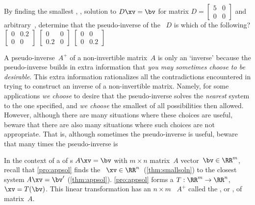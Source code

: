 \begin{activity}
By finding the smallest , , solution to \(D\xv=\bv\) for matrix \(D=\begin{bmatrix} 5&0\\0&0 \end{bmatrix}\) and arbitrary~\bv, determine that the pseudo-inverse of the ~\(D\) is which of the following?
{\(\begin{bmatrix} 0&0.2\\0&0 \end{bmatrix}\)}
{\(\begin{bmatrix} 0&0\\0.2&0 \end{bmatrix}\)}
{\(\begin{bmatrix} 0&0\\0&0.2 \end{bmatrix}\)}
\end{activity}




A pseudo-inverse~\(A^+\) of a non-invertible matrix~\(A\) is only an `inverse' because the pseudo-inverse builds in extra information that  \emph{you may sometimes choose to be desirable}.
This extra information rationalizes all the contradictions encountered in trying to construct an inverse of a non-invertible matrix.  
Namely, for some applications \emph{we choose} to desire that the pseudo-inverse solves the \emph{nearest}  system to the one specified, and \emph{we choose} the smallest of all possibilities then allowed.
However, although there are many situations where these choices are useful, beware that there are also many situations where such choices are not appropriate.
That is, although sometimes the pseudo-inverse is useful, beware that  many times the pseudo-inverse is 


\begin{theorem} \label{thm:lsqlt}
In the context of a  of s \(A\xv=\bv\) with \(m\times n\) matrix~\(A\) vector~\(\bv\in\RR^m\), recall that \cref{pro:appsol} finds the ~\(\xv\in\RR^n\)\ (\cref{thm:smallsoln}) to the closest  system \(A\xv=\bv'\) (\cref{thm:appsol}).
\cref{pro:appsol} forms a  \(T:\RR^m\to\RR^n\), \(\xv=T(\bv)\).
This linear transformation has an \(n\times m\) ~\(A^+\) called the , or , of matrix~\(A\).
\end{theorem}

